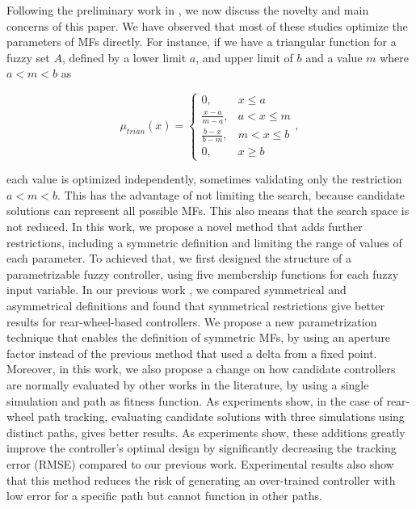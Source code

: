 \documentclass[symmetry,article,submit,moreauthors,pdftex]{Definitions/mdpi}
\begin{document}
Following the preliminary work in
\cite{mancilla2022tracking,Mancilla2021}, we now discuss the novelty and main
concerns of this paper. 
We have observed that most of these studies optimize the parameters of MFs
directly. For instance, if we have a triangular function for a fuzzy set $A$,
defined by a lower limit $a$, and upper limit of $b$ and a value $m$ where $a <
m <b$ as 

\begin{equation}\label{eq:triangular}
\mu_{trian}(x) = 
\begin{cases}
    0, & x \le a \\
    \frac{x-a}{m-a}, & a < x \le m \\ 
    \frac{b-x}{b-m}, & m < x \le b \\ 
    0, & x \ge b
\end{cases},
\end{equation}

each value is optimized independently, sometimes validating only the
restriction $a < m <b$. This has the advantage of not limiting the 
search, because candidate solutions can represent all possible MFs. This 
also means that the search space is not reduced.   
In this work, we propose a novel method that adds further restrictions,
including a symmetric definition and limiting the range of values of each
parameter. To achieved that, we first designed the structure of a parametrizable 
fuzzy controller, using five membership functions for each fuzzy input variable.
In our previous work \cite{mancilla2022tracking,Mancilla2021}, we
compared symmetrical and asymmetrical definitions and found that symmetrical
restrictions give better results for rear-wheel-based controllers. We propose a
new parametrization technique that enables the definition of symmetric MFs, by
using an aperture factor instead of the previous method that used a delta from
a fixed point.  Moreover, in this work, we also propose a change on how
candidate controllers are normally evaluated by other works in the literature,
by using a single simulation and path as fitness function. As experiments show,
in the case of rear-wheel path tracking, evaluating candidate solutions with
three simulations using distinct paths, gives better results.  As experiments
show, these additions greatly improve the controller's optimal design by
significantly decreasing the tracking error (RMSE) compared to our previous
work. Experimental results also show that this method reduces the risk of
generating an over-trained controller with low error for a specific path but
cannot function in other paths. 
\end{document}
